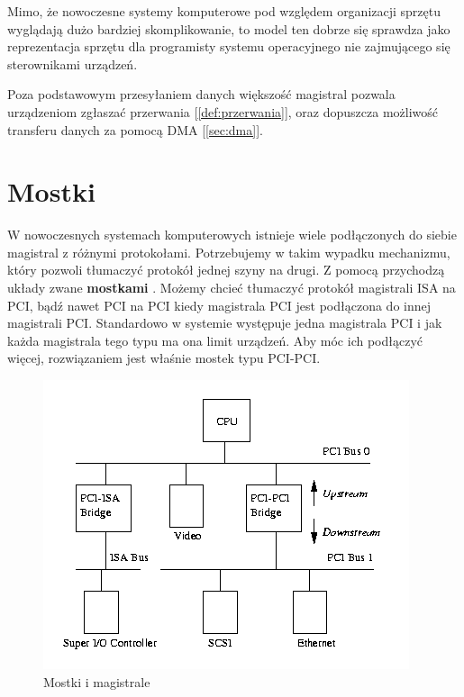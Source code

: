 \documentclass[shortabstract,inz]{iithesis}
\begin{document}
Mimo, że nowoczesne systemy komputerowe pod względem organizacji sprzętu wyglądają dużo bardziej
skomplikowanie, to model ten dobrze się sprawdza jako reprezentacja sprzętu dla
programisty systemu operacyjnego nie zajmującego się sterownikami urządzeń.

Poza podstawowym przesyłaniem danych większość magistral pozwala urządzeniom
zgłaszać przerwania [\ref{def:przerwania}], oraz dopuszcza możliwość transferu danych za pomocą DMA [\ref{sec:dma}].


\section{Mostki} %
W nowoczesnych systemach komputerowych istnieje wiele podłączonych do
siebie magistral z różnymi protokołami. Potrzebujemy w takim wypadku
mechanizmu, który pozwoli tłumaczyć protokół jednej szyny na drugi. Z
pomocą przychodzą układy zwane \textbf{mostkami} \cite{book:tanenbaum_hardware}. Możemy chcieć
tłumaczyć protokół magistrali ISA na PCI, bądź nawet PCI na PCI kiedy
magistrala PCI jest podłączona do innej magistrali
PCI. Standardowo w systemie występuje jedna magistrala PCI i jak każda magistrala tego typu
ma ona limit urządzeń. Aby móc ich podłączyć więcej, rozwiązaniem jest właśnie mostek
typu PCI-PCI. 


\begin{figure}
  \begin{center}
    \includegraphics[width=\linewidth]{pci-system}
    \caption{Mostki i magistrale \cite{image:mostki}}
\end{center}
\end{figure}
\end{document}
